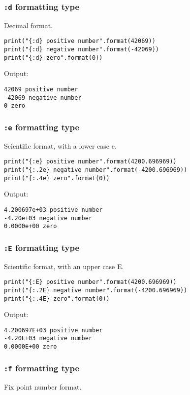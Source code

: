 \documentclass[11pt]{article}
\begin{document}
\subsubsection{\texttt{:d} formatting type}
\label{sec:org4464490}
Decimal format.

\begin{verbatim}
print("{:d} positive number".format(42069))
print("{:d} negative number".format(-42069))
print("{:d} zero".format(0))
\end{verbatim}

 \noindent Output:

\label{org871d451}
\begin{verbatim}
42069 positive number
-42069 negative number
0 zero
\end{verbatim}
\subsubsection{\texttt{:e} formatting type}
\label{sec:orgeb66fc0}
Scientific format, with a lower case e.

\begin{verbatim}
print("{:e} positive number".format(4200.696969))
print("{:.2e} negative number".format(-4200.696969))
print("{:.4e} zero".format(0))
\end{verbatim}

 \noindent Output:

\label{orgfd1e3d0}
\begin{verbatim}
4.200697e+03 positive number
-4.20e+03 negative number
0.0000e+00 zero
\end{verbatim}
\subsubsection{\texttt{:E} formatting type}
\label{sec:org9bf8db1}
Scientific format, with an upper case E.

\begin{verbatim}
print("{:E} positive number".format(4200.696969))
print("{:.2E} negative number".format(-4200.696969))
print("{:.4E} zero".format(0))
\end{verbatim}

 \noindent Output:

\label{orgd0cc860}
\begin{verbatim}
4.200697E+03 positive number
-4.20E+03 negative number
0.0000E+00 zero
\end{verbatim}
\subsubsection{\texttt{:f} formatting type}
\label{sec:org79461f8}
Fix point number format.
\end{document}

